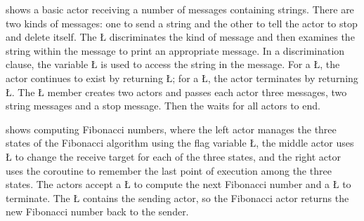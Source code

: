 \documentclass[openright,twoside]{report}
\begin{document}
 shows a basic actor receiving a number of messages containing strings.
There are two kinds of messages: one to send a string and the other to tell the actor to stop and delete itself.
The \LGinlinetrue\LGbegin\lgrinde\L{}\endlgrinde\LGend{} discriminates the kind of message and then examines the string within the message to print an appropriate message.
In a discrimination clause, the variable \LGinlinetrue\LGbegin\lgrinde\L{}\endlgrinde\LGend{} is used to access the string in the message.
For a \LGinlinetrue\LGbegin\lgrinde\L{}\endlgrinde\LGend{}, the actor continues to exist by returning \LGinlinetrue\LGbegin\lgrinde\L{}\endlgrinde\LGend{};
for a \LGinlinetrue\LGbegin\lgrinde\L{}\endlgrinde\LGend{}, the actor terminates by returning \LGinlinetrue\LGbegin\lgrinde\L{}\endlgrinde\LGend{}.
The \LGinlinetrue\LGbegin\lgrinde\L{}\endlgrinde\LGend{} member creates two actors and passes each actor three messages, two string messages and a stop message.
Then the  waits for all actors to end.

 shows computing Fibonacci numbers, where the left actor manages the three states of the Fibonacci algorithm using the flag variable \LGinlinetrue\LGbegin\lgrinde\L{}\endlgrinde\LGend{}, the middle actor uses \LGinlinetrue\LGbegin\lgrinde\L{}\endlgrinde\LGend{} to change the receive target for each of the three states, and the right actor uses the coroutine to remember the last point of execution among the three states.
The actors accept a \LGinlinetrue\LGbegin\lgrinde\L{}\endlgrinde\LGend{} to compute the next Fibonacci number and a \LGinlinetrue\LGbegin\lgrinde\L{}\endlgrinde\LGend{} to terminate.
The \LGinlinetrue\LGbegin\lgrinde\L{}\endlgrinde\LGend{} contains the sending actor, so the Fibonacci actor returns the new Fibonacci number back to the sender.
\end{document}
